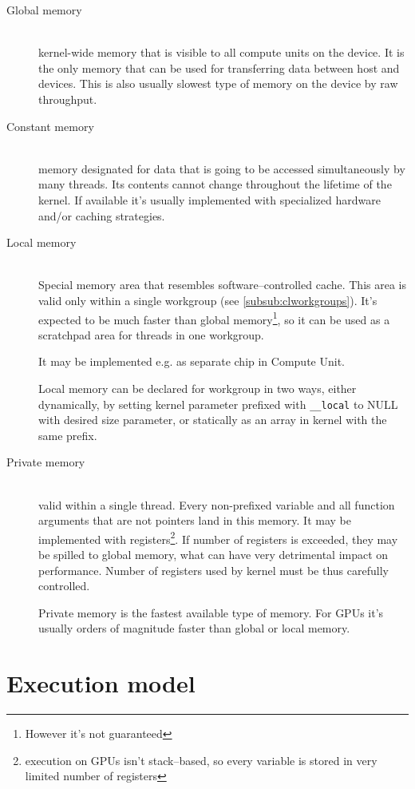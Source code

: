 \begin{description}
  \item[Global memory] \hfill \\
    kernel-wide memory that is visible to all compute units on the device.
    It is the only memory that can be used for transferring data between host and
    devices. This is also usually slowest type of memory on the device by raw
    throughput.
  \item[Constant memory] \hfill \\
    memory designated for data that is going to be accessed simultaneously by
    many threads. Its contents cannot change throughout the lifetime of the
    kernel. If available it's usually implemented with specialized hardware
    and/or caching strategies.
  \item[Local memory] \hfill \\
    Special memory area that resembles software--controlled cache. This area is
    valid only within a single workgroup (see \autoref{subsub:clworkgroups}). It's
    expected to be much faster than global memory\footnote{However it's not guaranteed},
    so it can be used as a scratchpad area for threads in one workgroup.

    It may be implemented e.g. as separate chip in Compute Unit.

    Local memory can be declared for workgroup in two ways, either dynamically,
    by setting kernel parameter prefixed with \texttt{\_\_local} to NULL with
    desired size parameter, or statically as an array in kernel with the same
    prefix.

  \item[Private memory] \hfill \\
    valid within a single thread. Every non-prefixed variable and all function
    arguments that are not pointers land in this memory. It may be implemented
    with registers\footnote{execution on GPUs isn't stack--based, so every variable
    is stored in very limited number of registers}. If number of registers is
    exceeded, they may be spilled to global memory, what can have very
    detrimental impact on performance. Number of registers used by kernel must
    be thus carefully controlled.

    Private memory is the fastest available type of memory. For GPUs it's usually
    orders of magnitude faster than global or local memory.
\end{description}

\section{Execution model}
\label{sec:clexecmodel}

